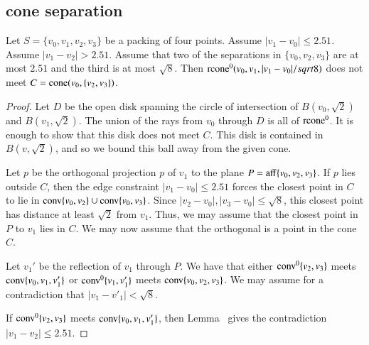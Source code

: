 \begin{tarskidata}
\begin{tarski}
\subsection{cone separation}

\begin{lemma}
Let $S=\{v_0,v_1,v_2,v_3\}$ be a packing of four points.
Assume $|v_1-v_0|\le 2.51$. Assume $|v_1-v_2|>2.51$.
Assume that two of the separations in $\{v_0,v_2,v_3\}$ are at
          most $2.51$ and the third is at most $\sqrt8$.
     Then ${\operatorname{rcone}}^0(v_0,v_1,|v_1-v_0|/sqrt8)$ does not meet
$C = {\operatorname{cone}}(v_0,\{v_2,v_3\})$.
\end{lemma}

\begin{proof}
Let $D$ be the open disk spanning the circle of intersection of
$B(v_0,\sqrt2)$ and $B(v_1,\sqrt2)$.  The union of the rays from $v_0$
through $D$ is all of ${\operatorname{rcone}}^0$.  It is enough to show that this
disk does not meet $C$.  This disk is contained in $B(v,\sqrt2)$,
and so we bound this ball away from the given cone.

Let $p$ be the orthogonal 
projection $p$ of $v_1$ to the plane $P={\operatorname{aff}}\{v_0,v_2,v_3\}$.
If $p$  lies outside $C$, then the
edge constraint $|v_1-v_0|\le 2.51$ forces the closest point in $C$ to
lie in ${\operatorname{conv}}\{v_0,v_2\}\cup{\operatorname{conv}}\{v_0,v_3\}$.  Since
$|v_2-v_0|,|v_3-v_0|\le\sqrt8$, this closest point has distance at least
$\sqrt2$ from $v_1$. Thus, we may assume that the closest point in
$P$ to $v_1$ lies in $C$.
We may now assume that the
orthogonal 
is a point in the
cone $C$.

Let $v_1'$ be the reflection of $v_1$ through $P$.  We
have that either ${\operatorname{conv}}^0\{v_2,v_3\}$ meets ${\operatorname{conv}}\{v_0,v_1,v'_1\}$ or
${\operatorname{conv}}^0\{v_1,v'_1\}$ meets ${\operatorname{conv}}\{v_0,v_2,v_3\}$.  We may assume for
a contradiction that $|v_1-v'_1|<\sqrt8$.

If ${\operatorname{conv}}^0\{v_2,v_3\}$ meets ${\operatorname{conv}}\{v_0,v_1,v'_1\}$, then
Lemma~ gives the contradiction
$|v_1-v_2|\le2.51$.


\end{proof}
\end{tarski}
\end{tarskidata}
